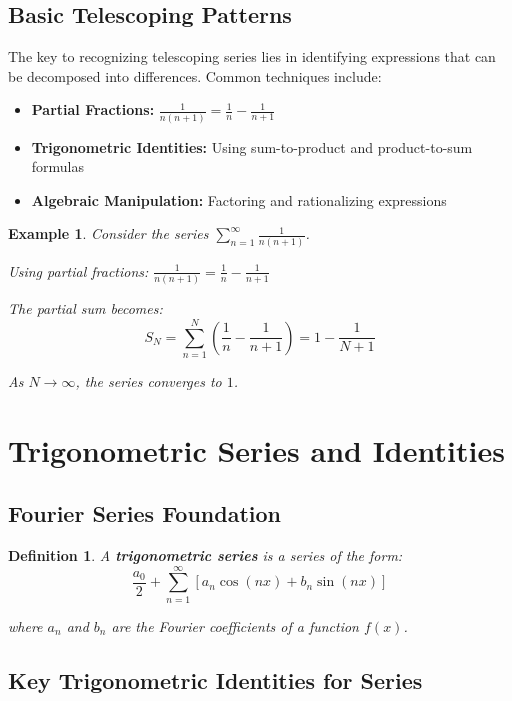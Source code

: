 \documentclass[12pt]{article}
\newtheorem{definition}{Definition}
\newtheorem{example}{Example}
\begin{document}
\subsection{Basic Telescoping Patterns}

The key to recognizing telescoping series lies in identifying expressions that can be decomposed into differences. Common techniques include:

\begin{itemize}
\item \textbf{Partial Fractions:} $\frac{1}{n(n+1)} = \frac{1}{n} - \frac{1}{n+1}$
\item \textbf{Trigonometric Identities:} Using sum-to-product and product-to-sum formulas
\item \textbf{Algebraic Manipulation:} Factoring and rationalizing expressions
\end{itemize}

\begin{example}
Consider the series $\sum_{n=1}^{\infty} \frac{1}{n(n+1)}$.

Using partial fractions: $\frac{1}{n(n+1)} = \frac{1}{n} - \frac{1}{n+1}$

The partial sum becomes:
$$S_N = \sum_{n=1}^{N} (\frac{1}{n} - \frac{1}{n+1}) = 1 - \frac{1}{N+1}$$

As $N \to \infty$, the series converges to $1$.
\end{example}

\section{Trigonometric Series and Identities}

\subsection{Fourier Series Foundation}

\begin{definition}
A \textbf{trigonometric series} is a series of the form:
$$\frac{a_0}{2} + \sum_{n=1}^{\infty} [a_n \cos(nx) + b_n \sin(nx)]$$

where $a_n$ and $b_n$ are the Fourier coefficients of a function $f(x)$.
\end{definition}

\subsection{Key Trigonometric Identities for Series}
\end{document}
